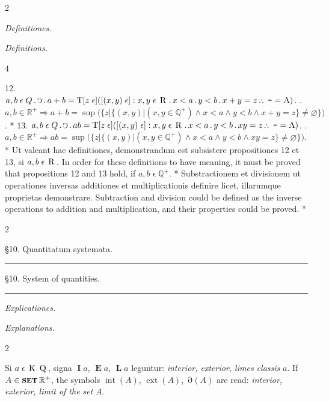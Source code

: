 \documentclass{book}
\newcommand{\s}{\switchcolumn} %
\newcommand{\C}{\mathop{\sbox0{$\displaystyle$$\reflectbox{C}$} %
\raisebox{-\height+\ht0-0.05cm}[\ht0][\dp0]{\scalebox{0.8}[0.8]{\copy0}}}\displaylimits} %
\newcommand{\p}{\mathop{\sbox0{$\displaystyle$$.$}
\raisebox{-\height+\ht0}[\ht0][\dp0]{\scalebox{1}[1]{\copy0}}}\displaylimits} %
\newcommand{\pppNoSpace}{\leavevmode\lower0ex\hbox{.}\kern-0.1em\raise0.7ex\hbox{.}\kern-0.1em\lower0ex\hbox{.}} %
\newcommand{\ppp}{\thinspace \pppNoSpace\thinspace} %
\newcommand{\no}{\mathop{\thinspace \scalebox{1.5}{-}}}
\newcommand{\abs}{\mathop{\rotatebox[origin=c]{180}{V}}}
\newcommand{\smaller}{\mathrel{<}}
\newcommand{\smallIn}{\ensuremath{\mathrel{\epsilon}}}
\newcommand{\I}{\mathop{\textbf{I}}}
\newcommand{\E}{\mathop{\textbf{E}}}
\newcommand{\Lfat}{\mathop{\textbf{L}}}
\newcommand{\K}{\mathop{\thinspace \text{K} \thinspace}}
\newcommand{\R}{\mathop{\thinspace \text{R} \thinspace}}
\newcommand{\Q}{\mathop{\thinspace \text{Q} \thinspace}}
\newcommand{\T}{\mathop{\text{T}}}
\newcommand{\setOfSets}{\mathop{\text{{\footnotesize \textbf{SET}}}}}
\renewcommand{\rightarrow}{\Rightarrow}
\DeclareMathOperator{\interior}{int}
\DeclareMathOperator{\exterior}{ext}
\DeclareMathOperator{\boundary}{\partial}
\newcommand\peanoHeadingSmall[1]{ \vspace{0.75cm} \textit{#1} \nopagebreak[4]

\vspace{0.25cm} \nopagebreak[1]}
\newcommand\peanoHeadingMedium[1]{ \vspace{1cm} {\Large #1} \nopagebreak[4]

  \noindent\rule{1cm}{0.4pt} \nopagebreak[1]}
\newenvironment{translateTwoCol}
               { %
                 \columnratio{0.5, 0.5}
                 \begin{paracol}{2}
                 \newcommand{\LAT}{\switchcolumn[0]*}
                 \newcommand{\ENG}{\switchcolumn[1]}
               }
               { %
                 \let\ENG\undefined
                 \let\LAT\undefined
                 \end{paracol}
               }
\newenvironment{translateFourCol}[4]
               { %
                 \setcolumnwidth{#1\fill/1em, #2\fill/\columnsep, #3\fill/1em, #4\fill}
                 \begin{paracol}{4}
                 \newcommand{\LAT}{\switchcolumn[0]*}
                 \newcommand{\ENG}{\switchcolumn[2]}
               }
               { %
                 \let\ENG\undefined
                 \let\LAT\undefined
                 \end{paracol}
               }
\begin{document}
\begin{translateTwoCol}
\centering
{}
{}
\peanoHeadingSmall{Definitiones.}
\s
\peanoHeadingSmall{Definitions.}
\end{translateTwoCol}

\begin{translateFourCol}{0.08}{0.42}{0.08}{0.42}
\raggedright
12. \s $a,b \smallIn Q \p \C \p a + b = \T [z \smallIn] ([(x,y) \smallIn] : x,y \smallIn \R \p x \smaller a \p y \smaller b \p x + y = z \ppp \no = \abs)$.
\ENG
12. \s $a,b \in \mathbb{R}^+ \rightarrow  a + b = \sup\Big( \Big\{z \Big| \{(x,y) | (x,y \in \mathbb{Q}^+) \wedge x < a \wedge y < b \wedge x + y = z \} \neq \varnothing \Big\} \Big)$.
\LAT
13. \s $a,b \smallIn Q \p \C \p ab = \T [z \smallIn] ([(x,y) \smallIn] : x,y \smallIn \R \p x \smaller a \p y \smaller b \p xy = z \ppp \no = \abs)$.
\ENG
13. \s $a,b \in \mathbb{R}^+ \rightarrow ab = \sup\Big( \Big\{ z \Big| \{(x,y) |  (x,y \in \mathbb{Q}^+) \wedge x < a \wedge y < b \wedge xy = z \} \neq \varnothing \Big\} \Big)$.
\LAT
\vspace{1em} \s Ut valeant hae definitiones, demonstrandum est subsistere propositiones 12 et 13, si $a,b \smallIn \R$.
\ENG
\vspace{1em} \s In order for these definitions to have meaning, it must be proved that propositions 12 and 13 hold, if $a,b \smallIn \mathbb{Q}^+$.
\LAT
\vspace{1em} \s Substractionem et divisionem ut operationes inversas additiones et multiplicationis definire licet, illarumque proprietas demonstrare.
\ENG
\vspace{1em} \s Subtraction and division could be defined as the inverse operations to addition and multiplication, and their properties could be proved.
\LAT
\end{translateFourCol}

\begin{translateTwoCol}
\centering
{}
{}
\peanoHeadingMedium{\S10. Quantitatum systemata.}
\s
\peanoHeadingMedium{\S10. System of quantities.}
\s*
{}
{}
\peanoHeadingSmall{Explicationes.}
\s
\peanoHeadingSmall{Explanations.}
\end{translateTwoCol}

\begin{translateTwoCol}
\raggedright
Si $a \smallIn \K \Q$, signa $\I a$, $\E a$, $\Lfat a$ leguntur: \emph{interior, exterior, limes classis} $a$.
\s
If $A \in \setOfSets \mathbb{R}^+$, the symbols $\interior(A)$, $\exterior(A)$, $\boundary(A)$ are read: \emph{interior, exterior, limit of the set} $A$.
\end{translateTwoCol}
\end{document}
